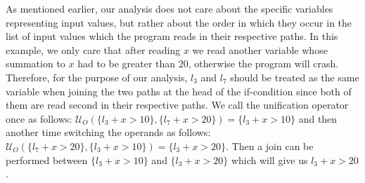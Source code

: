 \documentclass[10pt]{report}
\begin{document}
 As mentioned earlier, our analysis does not care about the specific variables representing input values, but rather about the order in which they occur in the list of input values which the program reads in their respective paths. In this example, we only care that after reading $ x $ we read another variable whose summation to $ x $ had to be greater than 20, otherwise the program will crash. Therefore, for the purpose of our analysis, $ l_{3} $  and $ l_{7} $ should be treated as the same variable when joining the two paths at the head of the if-condition since both of them are read second in their respective paths. We call the unification operator once as follows: $ \mathcal{U}_{O}(\lbrace l_{3} + x > 10 \rbrace, \lbrace l_{7} + x > 20 \rbrace) =  \lbrace l_{3} + x > 10 \rbrace$ and then another time switching the operands as follows: $ \mathcal{U}_{O}(\lbrace l_{7} + x > 20 \rbrace, \lbrace l_{3} + x > 10 \rbrace) =  \lbrace l_{3} + x > 20 \rbrace$. Then a join can be performed between $ \lbrace l_{3} + x > 10 \rbrace $ and $ \lbrace l_{3} + x > 20 \rbrace $ which will give us $ l_{3} + x > 20 $. 
\end{document}
